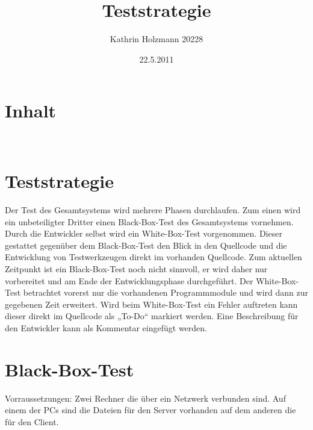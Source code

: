 \documentclass[a4paper,15pt]{article}
\title{Teststrategie}
\author{Kathrin Holzmann 20228}
\date{22.5.2011}
\begin{document}
\sffamily
\maketitle
\newpage


\section*{Inhalt}

\tableofcontents

\newpage
\
\section{Teststrategie}

Der Test des Gesamtsystems wird mehrere Phasen durchlaufen.
Zum einen wird ein unbeteiligter Dritter einen Black-Box-Test des Gesamtsystems vornehmen. Durch die Entwickler selbst wird ein White-Box-Test vorgenommen.
\newline
\newline
Dieser gestattet gegenüber dem Black-Box-Test den Blick in den Quellcode und die Entwicklung von
Testwerkzeugen direkt im vorhanden Quellcode.
\newline
\newline
Zum aktuellen Zeitpunkt ist ein Black-Box-Test noch nicht sinnvoll, er wird daher nur vorbereitet und
am Ende der Entwicklungsphase durchgeführt. Der White-Box-Test betrachtet vorerst nur die
vorhandenen Programmmodule und wird dann zur gegebenen Zeit erweitert.
Wird beim White-Box-Test ein Fehler auftreten kann dieser direkt im Quellcode als „To-Do“ markiert
werden. Eine Beschreibung für den Entwickler kann als Kommentar eingefügt werden.
\newpage
\section{Black-Box-Test}
Vorraussetzungen: Zwei Rechner die über ein Netzwerk verbunden sind. Auf einem der PCs sind die Dateien für den Server vorhanden auf dem anderen die für den Client.
\newline
\end{document}
